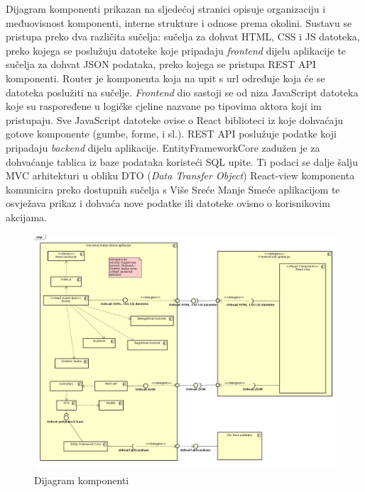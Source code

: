 			Dijagram komponenti prikazan na sljedećoj stranici opisuje organizaciju i međuovisnost komponenti, interne strukture i odnose prema okolini. Sustavu se pristupa preko dva različita sučelja: sučelja za dohvat HTML, CSS i JS datoteka, preko kojega se poslužuju datoteke koje pripadaju \textit{frontend} dijelu aplikacije te sučelja za dohvat JSON podataka, preko kojega se pristupa REST API komponenti. Router je komponenta koja na upit s url određuje koja će se datoteka poslužiti na sučelje. \textit{Frontend} dio sastoji se od niza JavaScript datoteka koje su raspoređene u logičke cjeline nazvane po tipovima aktora koji im pristupaju. Sve JavaScript datoteke ovise o React biblioteci iz koje dohvaćaju gotove komponente (gumbe, forme, i sl.). REST API poslužuje podatke koji pripadaju \textit{backend} dijelu aplikacije. EntityFrameworkCore zadužen je za dohvaćanje tablica iz baze podataka koristeći SQL upite. Ti podaci se dalje šalju MVC arhitekturi u obliku DTO (\textit{Data Transfer Object}) React-view komponenta komunicira preko dostupnih sučelja s Više Sreće Manje Smeće aplikacijom te osvježava prikaz i dohvaća nove podatke ili datoteke ovisno o korisnikovim akcijama.


			\eject

			\begin{figure}
				\centering
				\includegraphics[width=1.0\linewidth]{slike/ComponentDiagram.jpg}
				\caption{Dijagram komponenti}
				\label{fig:ComponentDiagram}
			\end{figure}

			\clearpage
			\eject